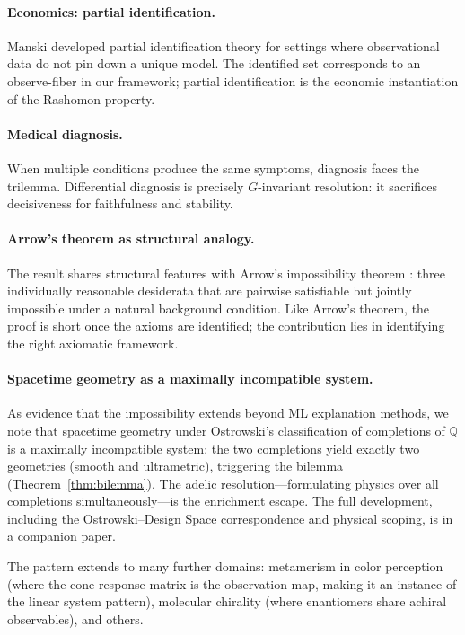 \documentclass[11pt,a4paper]{article}
\begin{document}
\paragraph{Economics: partial identification.}
Manski \citep{manski2003partial} developed partial identification theory for
settings where observational data do not pin down a unique model.  The
identified set corresponds to an observe-fiber in our framework; partial
identification is the economic instantiation of the Rashomon property.

\paragraph{Medical diagnosis.}
When multiple conditions produce the same symptoms, diagnosis faces the
trilemma.  Differential diagnosis is precisely $G$-invariant resolution:
it sacrifices decisiveness for faithfulness and stability.

\paragraph{Arrow's theorem as structural analogy.}
The result shares structural features with Arrow's impossibility
theorem \citep{arrow1951social}: three individually reasonable desiderata
that are pairwise satisfiable but jointly impossible under a natural
background condition.  Like Arrow's theorem, the proof is short once the
axioms are identified; the contribution lies in identifying the right
axiomatic framework.

\paragraph{Spacetime geometry as a maximally incompatible system.}
As evidence that the impossibility extends beyond ML explanation methods,
we note that spacetime geometry under Ostrowski's classification of
completions of $\mathbb{Q}$ is a maximally incompatible system: the two
completions yield exactly two geometries (smooth and ultrametric),
triggering the bilemma (Theorem~\ref{thm:bilemma}).  The adelic
resolution---formulating physics over all completions
simultaneously---is the enrichment escape.  The full development,
including the Ostrowski--Design Space correspondence and physical
scoping, is in a companion paper.

The pattern extends to many further domains: metamerism in color perception (where the cone response matrix is the observation map, making it an instance of the linear system pattern), molecular chirality (where enantiomers share achiral observables), and others.
\end{document}
